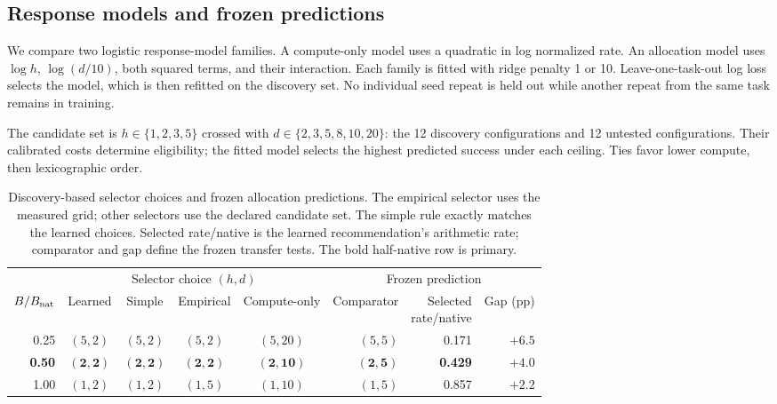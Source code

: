 \documentclass{article}
\begin{document}
\FloatBarrier
\subsection{Response models and frozen predictions}
\label{sec:prediction}

We compare two logistic response-model families. A compute-only model uses a
quadratic in log normalized rate. An allocation model uses $\log h$,
$\log(d/10)$, both squared terms, and their interaction. Each family is fitted
with ridge penalty 1 or 10. Leave-one-task-out log loss selects the model, which
is then refitted on the discovery set. No individual seed repeat is held out
while another repeat from the same task remains in training.

The candidate set is $h\in\{1,2,3,5\}$ crossed with $d\in\{2,3,5,8,10,20\}$:
the 12 discovery configurations and 12 untested configurations. Their calibrated costs determine
eligibility; the fitted model selects the highest predicted success under each
ceiling. Ties favor lower compute, then lexicographic order.

\begin{table}[htbp]
\centering\small
\setlength{\tabcolsep}{2.4pt}
\caption{Discovery-based selector choices and frozen allocation predictions.
The empirical selector uses the measured grid; other selectors use the declared
candidate set. The simple rule exactly matches the learned choices. Selected
rate/native is the learned recommendation's arithmetic rate; comparator and gap
define the frozen transfer tests. The bold half-native row is primary.
}
\label{tab:selectors}
\label{tab:predictions}
\begin{tabular}{@{}rccccrrr@{}}
\toprule
& \multicolumn{4}{c}{Selector choice $(h,d)$} & \multicolumn{3}{c}{Frozen prediction}\\
\cmidrule(lr){2-5}\cmidrule(l){6-8}
$B/B_{\rm nat}$ & Learned & Simple & Empirical & Compute-only & Comparator & \shortstack{Selected\\rate/native} & Gap (pp)\\
\midrule
0.25 & $(5,2)$ & $(5,2)$ & $(5,2)$ & $(5,20)$ & $(5,5)$ & 0.171 & $+6.5$\\
\textbf{0.50} & $\mathbf{(2,2)}$ & $\mathbf{(2,2)}$ & $\mathbf{(2,2)}$ & $\mathbf{(2,10)}$ & $\mathbf{(2,5)}$ & \textbf{0.429} & $\mathbf{+4.0}$\\
1.00 & $(1,2)$ & $(1,2)$ & $(1,5)$ & $(1,10)$ & $(1,5)$ & 0.857 & $+2.2$\\
\bottomrule
\end{tabular}
\end{table}
\end{document}
